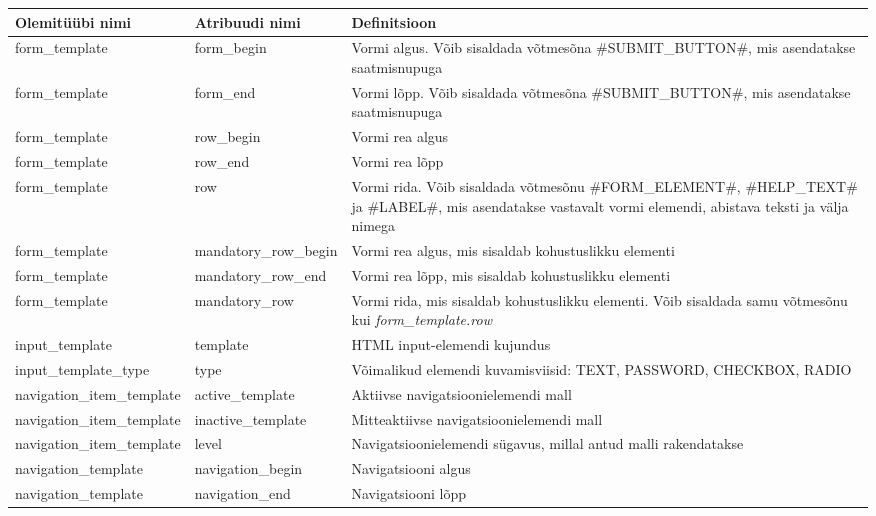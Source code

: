 \documentclass[a4paper,12pt]{article} %
\begin{document}
\begin{table}[H]
\centering
\begin{tabular}{|p{5cm}|p{5cm}|p{5cm}|}
\hline
\rowcolor{rowgray}
Olemitüübi nimi & Atribuudi nimi & Definitsioon \\ \hline
form\_template & form\_begin & Vormi algus. Võib sisaldada võtmesõna \#SUBMIT\_BUTTON\#, mis asendatakse saatmisnupuga \\ \hline
form\_template & form\_end & Vormi lõpp. Võib sisaldada võtmesõna \#SUBMIT\_BUTTON\#, mis asendatakse saatmisnupuga \\ \hline
form\_template & row\_begin & Vormi rea algus \\ \hline
form\_template & row\_end & Vormi rea lõpp \\ \hline
form\_template & row & Vormi rida. Võib sisaldada võtmesõnu \#FORM\_ELEMENT\#, \#HELP\_TEXT\# ja \#LABEL\#, mis asendatakse vastavalt vormi elemendi, abistava teksti ja välja nimega \\ \hline
form\_template & mandatory\_row\_begin & Vormi rea algus, mis sisaldab kohustuslikku elementi \\ \hline
form\_template & mandatory\_row\_end & Vormi rea lõpp, mis sisaldab kohustuslikku elementi \\ \hline
form\_template & mandatory\_row & Vormi rida, mis sisaldab kohustuslikku elementi. Võib sisaldada samu võtmesõnu kui \textit{form\_template.row} \\ \hline
input\_template & template & HTML input-elemendi kujundus \\ \hline
input\_template\_type & type & Võimalikud elemendi kuvamisviisid: TEXT, PASSWORD, CHECKBOX, RADIO \\ \hline
navigation\_item\_template & active\_template & Aktiivse navigatsioonielemendi mall \\ \hline
navigation\_item\_template & inactive\_template & Mitteaktiivse navigatsioonielemendi mall \\ \hline
navigation\_item\_template & level & Navigatsioonielemendi sügavus, millal antud malli rakendatakse \\ \hline
navigation\_template & navigation\_begin & Navigatsiooni algus \\ \hline
navigation\_template & navigation\_end & Navigatsiooni lõpp \\ \hline
\end{tabular}
\end{table}
\end{document}
